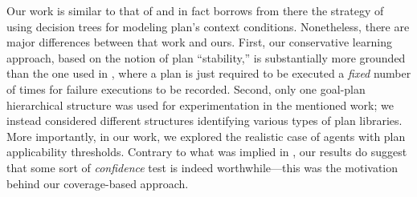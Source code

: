 Our work is similar to that of \cite{Airiau:IJAT:09} and in fact borrows from there the
strategy of using decision trees for modeling plan's context conditions.
Nonetheless, there are major differences between that work and ours.
First, our conservative learning approach, based on the notion of plan
``stability,'' is substantially more grounded than the one used in \cite{Airiau:IJAT:09},
where a plan is just required to be executed a \emph{fixed} number of times for
failure executions to be recorded.
Second, only one goal-plan hierarchical structure was used for experimentation
in the mentioned work; we instead considered different structures identifying
various types of plan libraries.
More importantly, in our work, we explored the realistic case of agents with
plan applicability thresholds. Contrary to what was implied in \cite{Airiau:IJAT:09}, our
results do suggest that some sort of \emph{confidence} test is indeed
worthwhile---this was the motivation behind our coverage-based approach.

